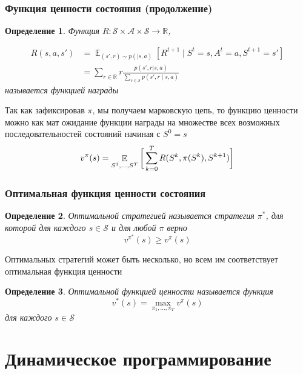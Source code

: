 \documentclass[notheorems]{beamer} %
\newtheorem{definition}{Определение}
\begin{document}
\begin{frame}
\frametitle{Функция ценности состояния (продолжение)}	
	\begin{definition}  Функция $R: \mathcal{S} \times \mathcal{A} \times \mathcal{S} \to \mathbb{R}$,
		
	\begin{align*}
		R(s,a, s')
		& =\mathop{\mathbb{E}}_{(s',r) \sim p( \mid s,a)}[R^{t+1} \mid S^t=s, A^t = a, S^{t+1}=s'] \\
		& = \sum_{r \in \mathbb{R}} r \frac{p(s',r|s,a)}{\sum_{s \in \mathcal{S}} p(s',r \mid s,a)}
	\end{align*}
	называется функцией награды
	\end{definition}

Так как зафиксировав $\pi$,  мы получаем марковскую цепь, то функцию ценности можно как мат ожидание функции награды на множестве всех возможных последовательностей состояний начиная с $S^0=s$
$$ v^\pi(s) = \mathop{\mathbb{E}}_{S^1, \dots, S^T} \bigg{[} \sum_{k=0}^{T}R(S^k,\pi(S^k),S^{k+1}) \bigg{]} $$
\end{frame}

\begin{frame}
\frametitle{Оптимальная функция ценности состояния }


	\begin{definition}
		Оптимальной стратегией называется стратегия $\pi^* $, для которой для каждого $s \in \mathcal{S}$  и для любой $\pi$  верно
		 $$ v^{\pi^*}(s) \geq v^{\pi}(s) $$ 
	\end{definition}
	Оптимальных стратегий может быть несколько, но всем им соответствует оптимальная функция ценности
	\begin{definition}
	Оптимальной функцией ценности называется функция $$ v^*(s)= \max_{\pi_1,\dots,\pi_T} v^\pi(s)$$ для каждого $s \in  \mathcal{S}$
	\end{definition}
	
\end{frame}	



\section{Динамическое программирование}
\end{document}
